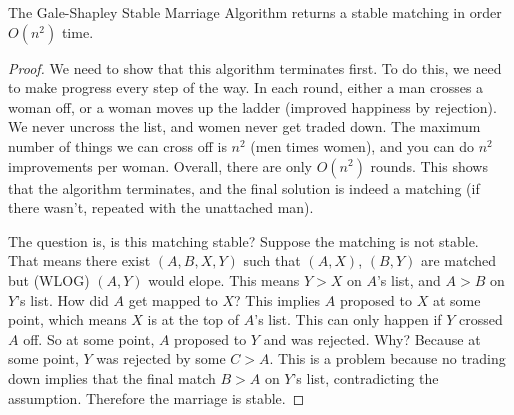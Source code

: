 \begin{theorem}
    The Gale-Shapley Stable Marriage Algorithm returns a stable matching in order $O(n^2)$ time.
\end{theorem}
\begin{proof}
    We need to show that this algorithm terminates first. To do this, we need to make progress every step of the way. In each round, either a man crosses a woman off, or a woman moves up the ladder (improved happiness by rejection). We never uncross the list, and women never get traded down. The maximum number of things we can cross off is $n^2$ (men times women), and you can do $n^2$ improvements per woman. Overall, there are only  $O(n^2)$ rounds. This shows that the algorithm terminates, and the final solution is indeed a matching (if there wasn't, repeated with the unattached man). 

    The question is, is this matching stable? Suppose the matching is not stable. That means there exist $(A,B,X,Y)$ such that $(A,X)$, $(B,Y)$ are matched but (WLOG) $(A,Y)$ would elope. This means $Y>X$ on $A $'s list, and $A>B$ on $Y$'s list. How did $A$ get mapped to $X$? This implies $A$ proposed to $X$ at some point, which means $X$ is at the top of $A$'s list. This can only happen if $Y$ crossed $A$ off. So at some point, $A$ proposed to $Y$ and was rejected. Why? Because at some point, $Y$ was rejected by some $C>A$. This is a problem because no trading down implies that the final match $B>A$ on $Y$'s list, contradicting the assumption. Therefore the marriage is stable.
\end{proof}

